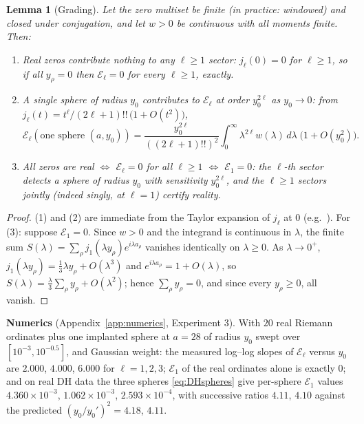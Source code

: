 \documentclass[11pt]{amsart}
\theoremstyle{plain}
\newtheorem{lemma}[theorem]{Lemma}
\theoremstyle{definition}
\theoremstyle{remark}
\newcommand{\EE}{\mathcal{E}}
\newcommand{\dd}{\,d}
\begin{document}
\begin{lemma}[Grading]\label{lem:grading}
Let the zero multiset be finite (in practice: windowed) and closed under conjugation, and let
$w>0$ be continuous with all moments finite. Then:
\begin{enumerate}
\item Real zeros contribute nothing to any $\ell\ge1$ sector: $j_\ell(0)=0$ for $\ell\ge1$, so
if all $y_\rho=0$ then $\EE_\ell=0$ for every $\ell\ge1$, exactly.
\item A single sphere of radius $y_0$ contributes to $\EE_\ell$ at order $y_0^{2\ell}$ as
$y_0\to0$: from $j_\ell(t)=t^\ell/(2\ell+1)!!\,\bigl(1+O(t^2)\bigr)$,
\[
\EE_\ell(\text{one sphere }(a,y_0))
=\frac{y_0^{2\ell}}{((2\ell+1)!!)^2}\int_0^\infty\lambda^{2\ell}w(\lambda)\dd\lambda
\;\bigl(1+O(y_0^2)\bigr).
\]
\item All zeros are real $\iff$ $\EE_\ell=0$ for all $\ell\ge1$ $\iff$ $\EE_1=0$: the $\ell$-th
sector detects a sphere of radius $y_0$ with sensitivity $y_0^{2\ell}$, and the $\ell\ge1$
sectors jointly (indeed singly, at $\ell=1$) certify reality.
\end{enumerate}
\end{lemma}

\begin{proof}
(1) and (2) are immediate from the Taylor expansion of $j_\ell$ at $0$
(e.g.\ \cite[10.52.1]{DLMF}). For (3): suppose $\EE_1=0$. Since $w>0$ and the integrand is
continuous in $\lambda$, the finite sum $S(\lambda)=\sum_\rho j_1(\lambda y_\rho)e^{i\lambda
a_\rho}$ vanishes identically on $\lambda\ge0$. As $\lambda\to0^+$,
$j_1(\lambda y_\rho)=\tfrac13\lambda y_\rho+O(\lambda^3)$ and $e^{i\lambda a_\rho}=1+O(\lambda)$,
so $S(\lambda)=\tfrac{\lambda}{3}\sum_\rho y_\rho+O(\lambda^2)$; hence $\sum_\rho y_\rho=0$,
and since every $y_\rho\ge0$, all vanish.
\end{proof}

\textbf{Numerics} (Appendix~\ref{app:numerics}, Experiment 3). With $20$ real Riemann ordinates
plus one implanted sphere at $a=28$ of radius $y_0$ swept over $[10^{-3},10^{-0.5}]$, and
Gaussian weight: the measured log--log slopes of $\EE_\ell$ versus $y_0$ are $2.000$, $4.000$,
$6.000$ for $\ell=1,2,3$; $\EE_1$ of the real ordinates alone is exactly $0$; and on real DH
data the three spheres \eqref{eq:DHspheres} give per-sphere $\EE_1$ values
$4.360\times10^{-3}$, $1.062\times10^{-3}$, $2.593\times10^{-4}$, with successive ratios
$4.11$, $4.10$ against the predicted $(y_0/y_0')^2=4.18$, $4.11$.
\end{document}
